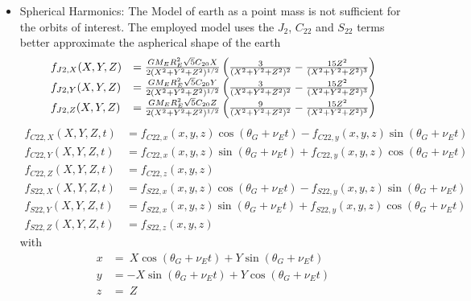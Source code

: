\documentclass[11pt,
               a4paper,
               bibtotoc,
               idxtotoc,
               headsepline,
               footsepline,
               footexclude,
               BCOR12mm,
               DIV13,
               openany,   %
               ]
               {scrbook}
\begin{document}
\begin{itemize}
        \item Spherical Harmonics: The Model of earth as a point mass is not sufficient for the orbits of interest.
        The employed model uses the \(J_{2}\), \(C_{22}\) and \(S_{22}\) terms better approximate the aspherical shape of the earth
        \begin{equation}
            \begin{array}{ll}
                f_{J2,X}(X,Y,Z) &=
                {GM_ER_E^2\sqrt{5}C_{20} X\over 2(X^2+Y^2+Z^2)^{1/2}} \left({3\over(X^2+Y^2+Z^2)^2}-{15Z^2\over(X^2+Y^2+Z^2)^3}\right) \\
                f_{J2,Y}(X,Y,Z) &=
                {GM_ER_E^2\sqrt{5}C_{20} Y\over 2(X^2+Y^2+Z^2)^{1/2}} \left({3\over(X^2+Y^2+Z^2)^2}-{15Z^2\over(X^2+Y^2+Z^2)^3}\right) \\
                f_{J2,Z}(X,Y,Z) &=
                {GM_ER_E^2\sqrt{5}C_{20} Z\over 2(X^2+Y^2+Z^2)^{1/2}} \left({9\over(X^2+Y^2+Z^2)^2}-{15Z^2\over(X^2+Y^2+Z^2)^3}\right)
            \end{array}
        \end{equation}
        \begin{equation}
            \begin{array}{ll}
                f_{C22,X}(X,Y,Z,t) &= f_{C22,x}(x,y,z)\cos(\theta_G+\nu_Et) - f_{C22,y}(x,y,z)\sin(\theta_G+\nu_Et) \\
                f_{C22,Y}(X,Y,Z,t) &= f_{C22,x}(x,y,z)\sin(\theta_G+\nu_Et) + f_{C22,y}(x,y,z)\cos(\theta_G+\nu_Et) \\
                f_{C22,Z}(X,Y,Z,t) &= f_{C22,z}(x,y,z)\\
                f_{S22,X}(X,Y,Z,t) &= f_{S22,x}(x,y,z)\cos(\theta_G+\nu_Et) - f_{S22,y}(x,y,z)\sin(\theta_G+\nu_Et) \\
                f_{S22,Y}(X,Y,Z,t) &= f_{S22,x}(x,y,z)\sin(\theta_G+\nu_Et) + f_{S22,y}(x,y,z)\cos(\theta_G+\nu_Et) \\
                f_{S22,Z}(X,Y,Z,t) &= f_{S22,z}(x,y,z)
            \end{array}
        \end{equation}
        with
        \begin{equation}
            \begin{array}{ll}
                x&=~X\cos(\theta_G+\nu_Et)+Y\sin(\theta_G+\nu_Et) \\
                y&=-X\sin(\theta_G+\nu_Et)+Y\cos(\theta_G+\nu_Et) \\
                z&=~Z
            \end{array}

\end{equation}
\end{itemize}
\end{document}
